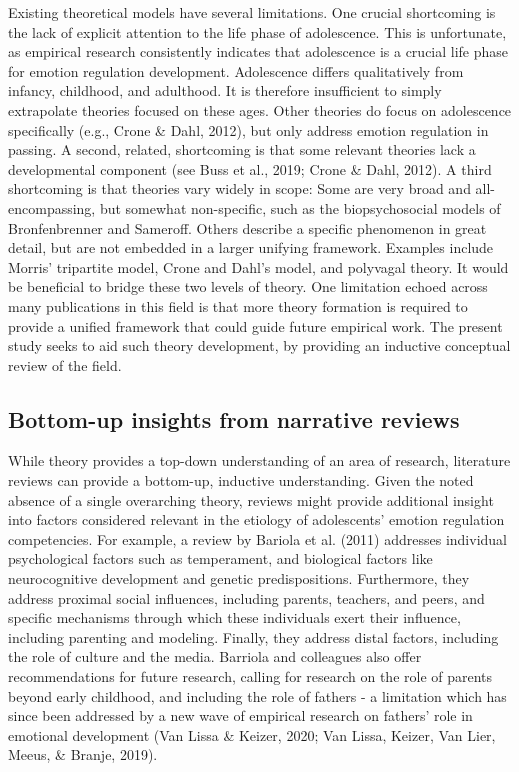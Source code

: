 \documentclass[
  english,
  man]{apa6}
\begin{document}
Existing theoretical models have several limitations. One crucial shortcoming
is the lack of explicit attention to the life phase of adolescence. This is
unfortunate, as empirical research consistently indicates that adolescence is a
crucial life phase for emotion regulation development. Adolescence differs
qualitatively from infancy, childhood, and adulthood. It is therefore
insufficient to simply extrapolate theories focused on these ages. Other
theories do focus on adolescence specifically (e.g., Crone \& Dahl, 2012), but only address emotion regulation
in passing. A second, related, shortcoming is that some relevant theories lack
a developmental component (see Buss et al., 2019; Crone \& Dahl, 2012). A third shortcoming is that theories
vary widely in scope: Some are very broad and all-encompassing, but somewhat
non-specific, such as the biopsychosocial models of Bronfenbrenner and
Sameroff. Others describe a specific phenomenon in great detail, but are not
embedded in a larger unifying framework. Examples include Morris' tripartite
model, Crone and Dahl's model, and polyvagal theory. It would be beneficial to
bridge these two levels of theory. One limitation echoed across many
publications in this field is that more theory formation is required to provide
a unified framework that could guide future empirical work. The present study
seeks to aid such theory development, by providing an inductive conceptual
review of the field.

\hypertarget{bottom-up-insights-from-narrative-reviews}{%
\subsection{Bottom-up insights from narrative reviews}\label{bottom-up-insights-from-narrative-reviews}}

While theory provides a top-down understanding of an area of research,
literature reviews can provide a bottom-up, inductive understanding. Given the
noted absence of a single overarching theory, reviews might provide additional
insight into factors considered relevant in the etiology of adolescents'
emotion regulation competencies. For example, a review by
Bariola et al. (2011) addresses individual psychological factors
such as temperament, and biological factors like neurocognitive development and
genetic predispositions. Furthermore, they address proximal social influences,
including parents, teachers, and peers, and specific mechanisms through which
these individuals exert their influence, including parenting and modeling.
Finally, they address distal factors, including the role of culture and the
media. Barriola and colleagues also offer recommendations for future research,
calling for research on the role of parents beyond early
childhood, and including the role of fathers - a limitation which has since
been addressed by a new wave of empirical research on fathers' role in
emotional development (Van Lissa \& Keizer, 2020; Van Lissa, Keizer, Van Lier, Meeus, \& Branje, 2019).
\end{document}

